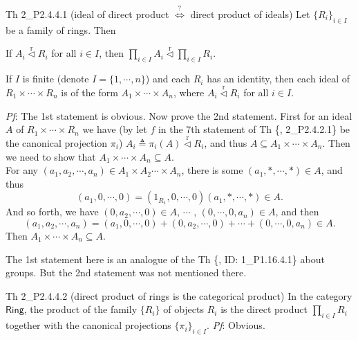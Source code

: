 \documentclass{article}
\newcommand{\nles}{\vartriangleleft}
\newcommand{\ideal}{\overset{\text{r}}{\nles}} %
\begin{document}
\begin{Th}{Th 2\_P2.4.4.1 (ideal of direct product $\overset{?}{\Longleftrightarrow}$ direct product of ideals)}
    Let $\{R_i\}_{i\in I}$ be a family of rings. Then
    \begin{compactenum}
        \item If $A_i\ideal R_i$ for all $i\in I$, then $\prod_{i\in I} A_i\ideal \prod_{i\in I} R_i$.
        \item If $I$ is finite (denote $I = \{1, \cdots, n\}$) and each $R_i$ has an identity, then each ideal of $R_1\times\cdots\times R_n$ is of the form $A_1\times\cdots\times A_n$, where $A_i\ideal R_i$ for all $i\in I$.
    \end{compactenum}
    \tcblower
    \textit{Pf}: The 1st statement is obvious. Now prove the 2nd statement. First for an ideal $A$ of $R_1\times\cdots\times R_n$ we have (by let $f$ in the 7th statement of Th \{, 2\_P2.4.2.1\} be the canonical projection $\pi_i$) $A_i\triangleq \pi_i(A)\ideal R_i$, and thus $A\subseteq A_1\times\cdots\times A_n$. Then we need to show that $A_1\times\cdots\times A_n\subseteq A$. \\
    For any $(a_1, a_2, \cdots, a_n)\in A_1\times A_2\cdots\times A_n$, there is some $(a_1, \ast, \cdots, \ast)\in A$, and thus
    $$ (a_1, 0, \cdots, 0) = (1_{R_1}, 0, \cdots, 0)(a_1, \ast, \cdots, \ast) \in A. $$
    And so forth, we have $(0, a_2, \cdots, 0)\in A$, \; $\cdots$ \;, $(0, \cdots, 0, a_n)\in A$, and then
    $$ (a_1, a_2, \cdots, a_n) = (a_1, 0, \cdots, 0) + (0, a_2, \cdots, 0) + \cdots + (0, \cdots, 0, a_n) \in A. $$
    Then $A_1\times\cdots\times A_n\subseteq A$. 
\end{Th}

\begin{Rmk}{}
    The 1st statement here is an analogue of the Th \{, ID: 1\_P1.16.4.1\} about groups. But the 2nd statement was not mentioned there.
\end{Rmk}

\begin{Th}{Th 2\_P2.4.4.2 (direct product of rings is the categorical product)}
    In the category $\mathsf{Ring}$, the product of the family $\{R_i\}$ of objects $R_i$ is the direct product $\prod_{i\in I} R_i$ together with the canonical projections $\{\pi_i\}_{i\in I}$.
    \tcblower
    \textit{Pf}: Obvious.
\end{Th}
\end{document}
